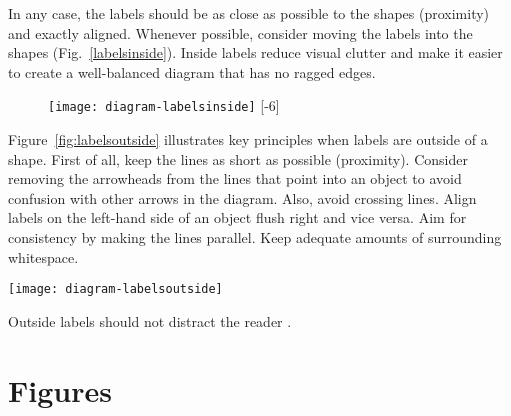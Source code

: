 In any case, the labels should be as close as possible to the shapes (proximity) and exactly aligned. Whenever possible, consider moving the labels into the shapes (Fig.~\ref{labelsinside}). Inside labels reduce visual clutter and make it easier to create a well-balanced diagram that has no ragged edges.

\begin{figure}[t]
\centering
\texttt{[image: diagram-labelsinside]}
[-6\baselineskip]
\end{figure}

Figure~\ref{fig:labelsoutside} illustrates key principles when labels are outside of a shape. First of all, keep the lines as short as possible (proximity). Consider removing the arrowheads from the lines that point into an object to avoid confusion with other arrows in the diagram. Also, avoid crossing lines. Align labels on the left-hand side of an object flush right and vice versa. Aim for consistency by making the lines parallel. Keep adequate amounts of surrounding whitespace.

\begin{marginfigure}
\centering
\texttt{[image: diagram-labelsoutside]}
\caption{\label{fig:labelsoutside} Outside labels should not distract the reader \cite{Carter12}.}%
\end{marginfigure}

\section{Figures}

















